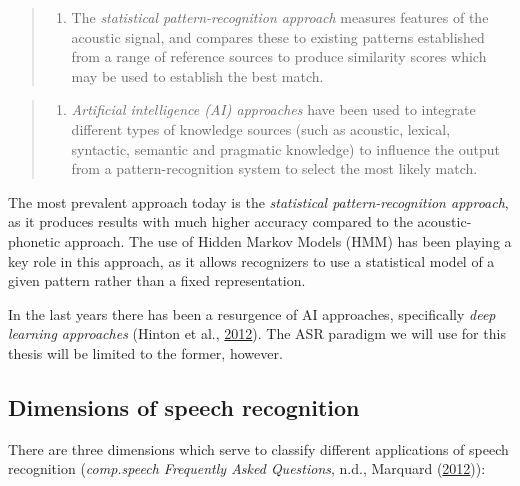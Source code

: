 \documentclass[]{article}
\providecommand{\tightlist}{%
  \setlength{\itemsep}{0pt}\setlength{\parskip}{0pt}}
\begin{document}
\begin{quote}
\begin{enumerate}
\def\labelenumi{\arabic{enumi}.}
\setcounter{enumi}{1}
\tightlist
\item
  The \emph{statistical pattern-recognition approach} measures features
  of the acoustic signal, and compares these to existing patterns
  established from a range of reference sources to produce similarity
  scores which may be used to establish the best match.
\end{enumerate}
\end{quote}

\begin{quote}
\begin{enumerate}
\def\labelenumi{\arabic{enumi}.}
\setcounter{enumi}{2}
\tightlist
\item
  \emph{Artificial intelligence (AI) approaches} have been used to
  integrate different types of knowledge sources (such as acoustic,
  lexical, syntactic, semantic and pragmatic knowledge) to influence the
  output from a pattern-recognition system to select the most likely
  match.
\end{enumerate}
\end{quote}

The most prevalent approach today is the \emph{statistical
pattern-recognition approach}, as it produces results with much higher
accuracy compared to the acoustic-phonetic approach. The use of Hidden
Markov Models (HMM) has been playing a key role in this approach, as it
allows recognizers to use a statistical model of a given pattern rather
than a fixed representation.

In the last years there has been a resurgence of AI approaches,
specifically \emph{deep learning approaches} (Hinton et al.,
\hyperref[ref-hinton2012deep]{2012}). The ASR paradigm we will use for
this thesis will be limited to the former, however.

\subsection{Dimensions of speech
recognition}\label{dimensions-of-speech-recognition}

There are three dimensions which serve to classify different
applications of speech recognition (\emph{comp.speech Frequently Asked
Questions}, n.d., Marquard (\hyperref[ref-marquard]{2012})):
\end{document}
